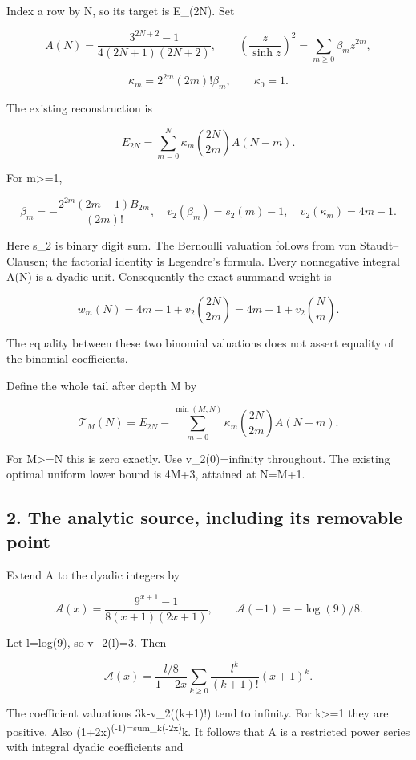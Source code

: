 \documentclass[11pt,letterpaper]{article}
\begin{document}
Index a row by N, so its target is E\_(2N). Set

\[
A(N)=\frac{3^{2N+2}-1}{4(2N+1)(2N+2)},\qquad
\left(\frac z{\sinh z}\right)^2=\sum_{m\ge0}\beta_mz^{2m},
\]

\[
\kappa_m=2^{2m}(2m)!\beta_m,\qquad \kappa_0=1.
\]

The existing reconstruction is

\[
E_{2N}=\sum_{m=0}^N\kappa_m\binom{2N}{2m}A(N-m).
\]

For m\textgreater=1,

\[
\beta_m=-\frac{2^{2m}(2m-1)B_{2m}}{(2m)!},\quad
v_2(\beta_m)=s_2(m)-1,\quad v_2(\kappa_m)=4m-1.
\]

Here s\_2 is binary digit sum. The Bernoulli valuation follows from von Staudt--Clausen; the factorial identity is Legendre's formula. Every nonnegative integral A(N) is a dyadic unit. Consequently the exact summand weight is

\[
w_m(N)=4m-1+v_2\binom{2N}{2m}=4m-1+v_2\binom Nm.
\]

The equality between these two binomial valuations does not assert equality of the binomial coefficients.

Define the whole tail after depth M by

\[
\mathcal T_M(N)=E_{2N}-\sum_{m=0}^{\min(M,N)}\kappa_m\binom{2N}{2m}A(N-m).
\]

For M\textgreater=N this is zero exactly. Use v\_2(0)=infinity throughout. The existing optimal uniform lower bound is 4M+3, attained at N=M+1.

\subsection{2. The analytic source, including its removable point}\label{the-analytic-source-including-its-removable-point}

Extend A to the dyadic integers by

\[
\mathscr A(x)=\frac{9^{x+1}-1}{8(x+1)(2x+1)},\qquad
\mathscr A(-1)=-\log(9)/8.
\]

Let l=log(9), so v\_2(l)=3. Then

\[
\mathscr A(x)=\frac{l/8}{1+2x}
\sum_{k\ge0}\frac{l^k}{(k+1)!}(x+1)^k.
\]

The coefficient valuations 3k-v\_2((k+1)!) tend to infinity. For k\textgreater=1 they are positive. Also (1+2x)\textsuperscript{(-1)=sum\_k(-2x)}k. It follows that A is a restricted power series with integral dyadic coefficients and
\end{document}
